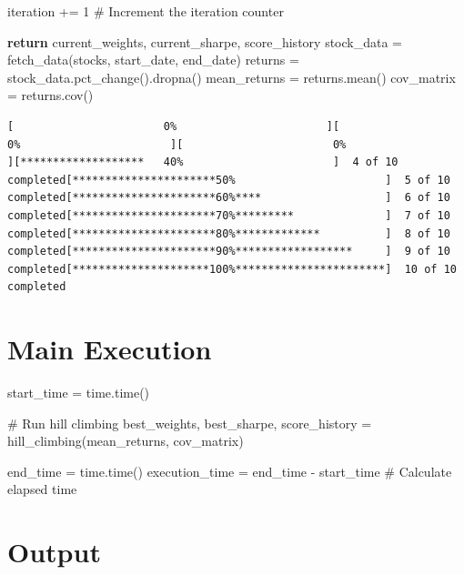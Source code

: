 \documentclass[
  letterpaper,
  DIV=11,
  numbers=noendperiod]{scrreprt}
\newenvironment{Shaded}{\begin{snugshade}}{\end{snugshade}}
\newcommand{\CommentTok}[1]{\textcolor[rgb]{0.37,0.37,0.37}{#1}}
\newcommand{\ControlFlowTok}[1]{\textcolor[rgb]{0.00,0.23,0.31}{\textbf{#1}}}
\newcommand{\DecValTok}[1]{\textcolor[rgb]{0.68,0.00,0.00}{#1}}
\newcommand{\NormalTok}[1]{\textcolor[rgb]{0.00,0.23,0.31}{#1}}
\newcommand{\OperatorTok}[1]{\textcolor[rgb]{0.37,0.37,0.37}{#1}}
\begin{document}
\begin{Shaded}
\begin{Highlighting}[]
\NormalTok{        iteration }\OperatorTok{+=} \DecValTok{1}  \CommentTok{\# Increment the iteration counter}
    
    \ControlFlowTok{return}\NormalTok{ current\_weights, current\_sharpe, score\_history}
\NormalTok{stock\_data }\OperatorTok{=}\NormalTok{ fetch\_data(stocks, start\_date, end\_date)}
\NormalTok{returns }\OperatorTok{=}\NormalTok{ stock\_data.pct\_change().dropna()}
\NormalTok{mean\_returns }\OperatorTok{=}\NormalTok{ returns.mean()}
\NormalTok{cov\_matrix }\OperatorTok{=}\NormalTok{ returns.cov()}
\end{Highlighting}
\end{Shaded}

\begin{verbatim}
[                       0%                       ][                       0%                       ][                       0%                       ][*******************   40%                       ]  4 of 10 completed[**********************50%                       ]  5 of 10 completed[**********************60%****                   ]  6 of 10 completed[**********************70%*********              ]  7 of 10 completed[**********************80%*************          ]  8 of 10 completed[**********************90%******************     ]  9 of 10 completed[*********************100%***********************]  10 of 10 completed
\end{verbatim}

\section{Main Execution}\label{main-execution-2}

\begin{Shaded}
\begin{Highlighting}[]
\NormalTok{start\_time }\OperatorTok{=}\NormalTok{ time.time()}

\CommentTok{\# Run hill climbing}
\NormalTok{best\_weights, best\_sharpe, score\_history }\OperatorTok{=}\NormalTok{ hill\_climbing(mean\_returns, cov\_matrix)}

\NormalTok{end\_time }\OperatorTok{=}\NormalTok{ time.time()}
\NormalTok{execution\_time }\OperatorTok{=}\NormalTok{ end\_time }\OperatorTok{{-}}\NormalTok{ start\_time  }\CommentTok{\# Calculate elapsed time}
\end{Highlighting}
\end{Shaded}

\section{Output}\label{output-2}
\end{document}
